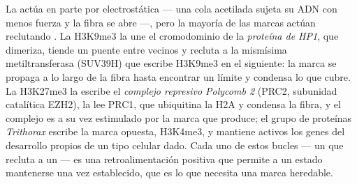 \begin{proposition}\label{prop:b3:chromatin-epigenetics:readers}
La  actúa en parte por electrostática --- una cola acetilada
sujeta su ADN con menos fuerza y la fibra se abre ---, pero la mayoría de
las marcas actúan reclutando . La H3K9me3 la une el cromodominio
de la \emph{proteína de  HP1}, que dimeriza, tiende un
puente entre  vecinos y recluta a la mismísima
metiltransferasa (SUV39H) que escribe H3K9me3 en el  siguiente:
la marca se propaga a lo largo de la fibra hasta encontrar un límite y
condensa lo que cubre. La H3K27me3 la escribe el \emph{complejo represivo
Polycomb 2} (PRC2, subunidad catalítica EZH2), la lee PRC1, que
ubiquitina la H2A y condensa la fibra, y el complejo es a su vez
estimulado por la marca que produce; el grupo de proteínas
\emph{Trithorax} escribe la marca opuesta, H3K4me3, y mantiene activos
los genes del desarrollo propios de un tipo celular dado. Cada uno de
estos bucles --- un  que recluta a un  --- es una
retroalimentación positiva que permite a un estado mantenerse una vez
establecido, que es lo que necesita una marca heredable.
\end{proposition}

